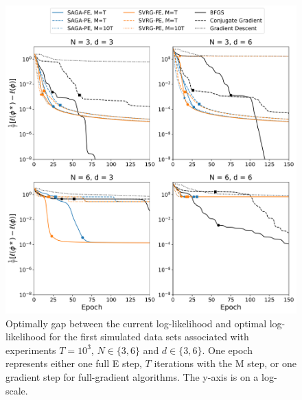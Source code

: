 \documentclass[12pt]{article}
\begin{document}
\begin{figure}[H]
    \centering
    \includegraphics[width=6.5in]{../plt/log-like_v_epoch_T-1000-000.png}
    \caption{Optimally gap between the current log-likelihood and optimal log-likelihood for the first simulated data sets associated with experiments $T=10^{3}$, $N \in \{3,6\}$ and $d \in \{3,6\}$. One epoch represents either one full E step, $T$ iterations with the M step, or one gradient step for full-gradient algorithms. The y-axis is on a log-scale.}
\end{figure}
%
\end{document}
